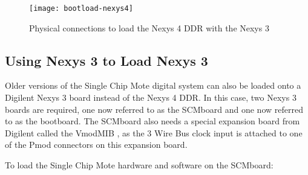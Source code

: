 \begin{figure}
\centering
\texttt{[image: bootload-nexys4]}
\caption{Physical connections to load the Nexys 4 DDR with the Nexys 3}
\label{fig:bootload-nexys4}
\end{figure}

\subsection{Using Nexys 3 to Load Nexys 3}
Older versions of the Single Chip Mote digital system can also be loaded onto a Digilent Nexys 3 board instead of the Nexys 4 DDR. In this case, two Nexys 3 boards are required, one now referred to as the SCMboard and one now referred to as the bootboard. The SCMboard also needs a special expansion board from Digilent called the VmodMIB \cite{vmodmib-store}, as the 3 Wire Bus clock input is attached to one of the Pmod connectors on this expansion board.

To load the Single Chip Mote hardware and software on the SCMboard:

